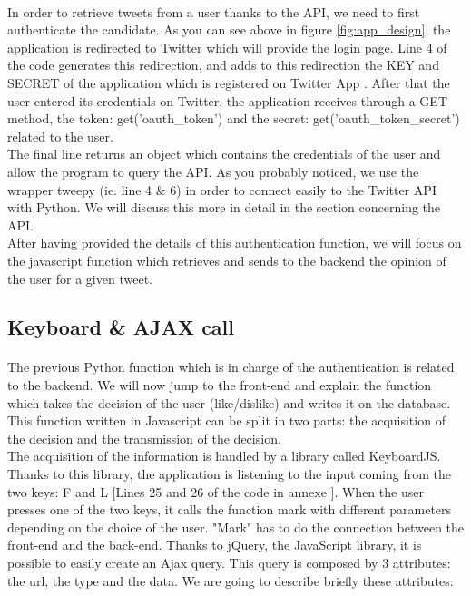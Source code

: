 \paragraph{}
In order to retrieve tweets from a user thanks to the API, we need to first authenticate the candidate. As you can see above in figure \ref{fig:app_design}, the application is redirected to Twitter which will provide the login page. Line 4 of the code generates this redirection, and adds to this redirection the KEY and SECRET of the application which is registered on Twitter App \cite{t_dev_auth}. After that the user entered its credentials on Twitter, the application receives through a GET method, the token: get('oauth\_token') and the secret: get('oauth\_token\_secret') related to the user. \\
The final line returns an object which contains the credentials of the user and allow the program to query the API. As you probably noticed, we use the wrapper tweepy (ie. line 4 \& 6) in order to connect easily to the Twitter API with Python. We will discuss this more in detail in the section concerning the API. \\
After having provided the details of this authentication function, we will focus on the javascript function which retrieves and sends to the backend the opinion of the user for a given tweet.

 

\subsection{Keyboard \& AJAX call}

\paragraph{}
The previous Python function which is in charge of the authentication is related to the backend. We will now jump to the front-end and explain the function which takes the decision of the user (like/dislike) and writes it on the database. This function written in Javascript can be split in two parts: the acquisition of the decision and the transmission of the decision.  \\
The acquisition of the information is handled by a library called KeyboardJS. Thanks to this library, the application is listening to the input coming from the two keys: F and L [Lines 25 and 26 of the code in annexe ]. When the user presses one of the two keys, it calls the function mark with different parameters depending on the choice of the user. "Mark" has to do the connection between the front-end and the back-end. Thanks to jQuery, the JavaScript library, it is possible to easily create an Ajax query. This query is composed by 3 attributes: the url, the type and the data. We are going to describe briefly these attributes:

